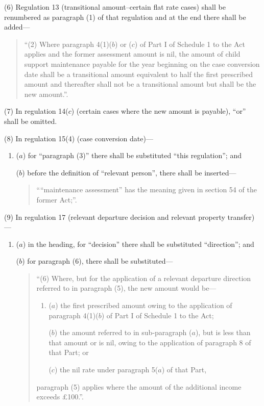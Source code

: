 \documentclass[12pt,a4paper]{article}
\begin{document}
(6) Regulation 13 (transitional amount–certain flat rate cases) shall be renumbered as paragraph (1) of that regulation and at the end there shall be added—
\begin{quotation}
“(2) Where paragraph 4(1)($b$)  or ($c$)  of Part I of Schedule 1 to the Act applies and the former assessment amount is nil, the amount of child support maintenance payable for the year beginning on the case conversion date shall be a transitional amount equivalent to half the first prescribed amount and thereafter shall not be a transitional amount but shall be the new amount.”.
\end{quotation}

(7) In regulation 14($c$)  (certain cases where the new amount is payable), “or” shall be omitted.

(8) In regulation 15(4) (case conversion date)—
\begin{enumerate}\item[]
($a$) for “paragraph (3)” there shall be substituted “this regulation”; and

($b$) before the definition of “relevant person”, there shall be inserted—
\begin{quotation}
    ““maintenance assessment” has the meaning given in section 54 of the former Act;”. 
\end{quotation}
\end{enumerate}

(9) In regulation 17 (relevant departure decision and relevant property transfer)—
\begin{enumerate}\item[]
($a$) in the heading, for “decision” there shall be substituted “direction”; and

($b$) for paragraph (6), there shall be substituted—
\begin{quotation}
“(6) Where, but for the application of a relevant departure direction referred to in paragraph (5), the new amount would be—
\begin{enumerate}\item[]
($a$) the first prescribed amount owing to the application of paragraph 4(1)($b$)  of Part I of Schedule 1 to the Act;

($b$) the amount referred to in sub-paragraph ($a$), but is less than that amount or is nil, owing to the application of paragraph 8 of that Part; or

($c$) the nil rate under paragraph 5($a$)  of that Part,
\end{enumerate}
paragraph (5) applies where the amount of the additional income exceeds £100.”.
\end{quotation}
\end{enumerate}
\end{document}
